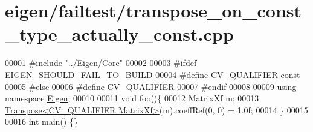 \hypertarget{eigen_2failtest_2transpose__on__const__type__actually__const_8cpp_source}{}\section{eigen/failtest/transpose\+\_\+on\+\_\+const\+\_\+type\+\_\+actually\+\_\+const.cpp}
\label{eigen_2failtest_2transpose__on__const__type__actually__const_8cpp_source}

\begin{DoxyCode}
00001 \textcolor{preprocessor}{#include "../Eigen/Core"}
00002 
00003 \textcolor{preprocessor}{#ifdef EIGEN\_SHOULD\_FAIL\_TO\_BUILD}
00004 \textcolor{preprocessor}{#define CV\_QUALIFIER const}
00005 \textcolor{preprocessor}{#else}
00006 \textcolor{preprocessor}{#define CV\_QUALIFIER}
00007 \textcolor{preprocessor}{#endif}
00008 
00009 \textcolor{keyword}{using namespace }\hyperlink{namespace_eigen}{Eigen};
00010 
00011 \textcolor{keywordtype}{void} foo()\{
00012     MatrixXf m;
00013     \hyperlink{group___core___module_class_eigen_1_1_transpose}{Transpose<CV\_QUALIFIER MatrixXf>}(m).coeffRef(0, 0) = 1.0f;
00014 \}
00015 
00016 \textcolor{keywordtype}{int} main() \{\}
\end{DoxyCode}
